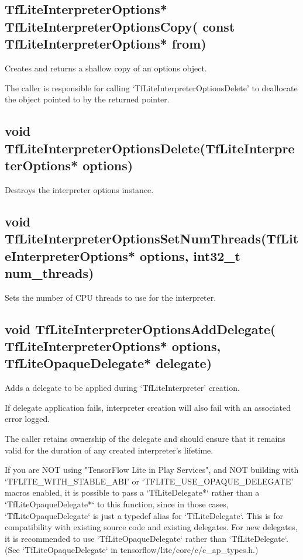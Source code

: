 \documentclass{ol-softwaremanual}
\begin{document}
\subsection{TfLiteInterpreterOptions* TfLiteInterpreterOptionsCopy(
    const TfLiteInterpreterOptions* from)}

Creates and returns a shallow copy of an options object.

The caller is responsible for calling `TfLiteInterpreterOptionsDelete' to
deallocate the object pointed to by the returned pointer.

\subsection{void TfLiteInterpreterOptionsDelete(TfLiteInterpreterOptions* options)}

Destroys the interpreter options instance.

\subsection{void TfLiteInterpreterOptionsSetNumThreads(TfLiteInterpreterOptions* options, int32\_t num\_threads)}

Sets the number of CPU threads to use for the interpreter.

\subsection{void TfLiteInterpreterOptionsAddDelegate(
    TfLiteInterpreterOptions* options, TfLiteOpaqueDelegate* delegate)}


Adds a delegate to be applied during `TfLiteInterpreter' creation.

If delegate application fails, interpreter creation will also fail with an associated error logged.

The caller retains ownership of the delegate and should ensure that it remains valid for the duration of any created interpreter's lifetime.

If you are NOT using "TensorFlow Lite in Play Services", and NOT building with `TFLITE\_WITH\_STABLE\_ABI' or `TFLITE\_USE\_OPAQUE\_DELEGATE' macros enabled, it is possible to pass a `TfLiteDelegate*` rather than a `TfLiteOpaqueDelegate*` to this function, since in those cases, `TfLiteOpaqueDelegate` is just a typedef alias for `TfLiteDelegate`. This is for compatibility with existing source code and existing delegates.  For new delegates, it is recommended to use `TfLiteOpaqueDelegate` rather than `TfLiteDelegate`. (See `TfLiteOpaqueDelegate` in tensorflow/lite/core/c/c\_ap\_types.h.)
\end{document}

